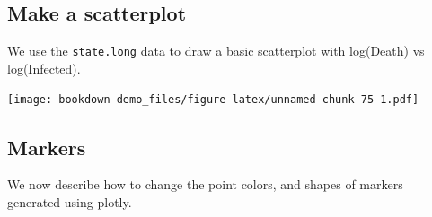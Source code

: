 \documentclass[]{book}
\newenvironment{Shaded}{\begin{snugshade}}{\end{snugshade}}
\newcommand{\KeywordTok}[1]{\textcolor[rgb]{0.13,0.29,0.53}{\textbf{#1}}}
\newcommand{\DataTypeTok}[1]{\textcolor[rgb]{0.13,0.29,0.53}{#1}}
\newcommand{\StringTok}[1]{\textcolor[rgb]{0.31,0.60,0.02}{#1}}
\newcommand{\OperatorTok}[1]{\textcolor[rgb]{0.81,0.36,0.00}{\textbf{#1}}}
\newcommand{\NormalTok}[1]{#1}
\begin{document}
\subsection{Make a scatterplot}\label{make-a-scatterplot}

We use the \texttt{state.long} data to draw a basic scatterplot with
log(Death) vs log(Infected).

\begin{Shaded}
\end{Shaded}

\texttt{[image: bookdown-demo\_files/figure-latex/unnamed-chunk-75-1.pdf]}

\subsection{Markers}\label{markers}

We now describe how to change the point colors, and shapes of markers
generated using plotly.
\end{document}
